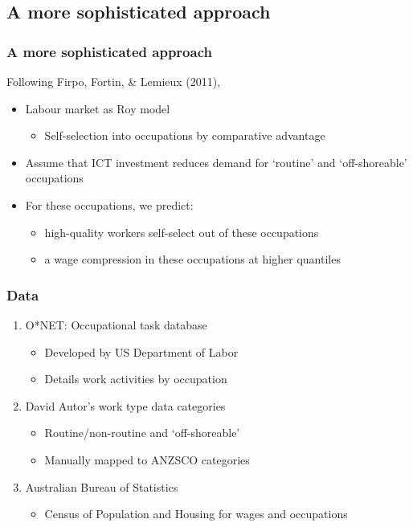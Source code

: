 \documentclass[red]{beamer}
\newcommand{\vitem}{\vfill\item}
\begin{document}
\subsection{A more sophisticated approach}
\begin{frame}
  \frametitle{A more sophisticated approach}
  Following Firpo, Fortin, \& Lemieux (2011),
  \begin{itemize}
  \vitem Labour market as Roy model
    \begin{itemize}
    \item Self-selection into occupations by comparative advantage
    \end{itemize}
    \pause
  \vitem Assume that ICT investment reduces demand for `routine' and `off-shoreable' occupations
    \pause
  \vitem For these occupations, we predict:
    \begin{itemize}
    \item high-quality workers self-select out of these occupations
    \item a wage compression in these occupations at higher quantiles
    \end{itemize}
  \end{itemize}
\end{frame}

\begin{frame}
  \frametitle{Data}
  \begin{enumerate}
  \item O*NET: Occupational task database
    \begin{itemize}
    \item Developed by US Department of Labor
    \item Details work activities by occupation
    \end{itemize}
    \vspace{10pt}
  \item David Autor's work type data categories
    \begin{itemize}
    \item Routine/non-routine and `off-shoreable'
    \item Manually mapped to ANZSCO categories
    \end{itemize}
    \vspace{10pt}
  \item Australian Bureau of Statistics
    \begin{itemize}
    \item Census of Population and Housing for wages and occupations
    \end{itemize}
  \end{enumerate}
\end{frame}
\end{document}
